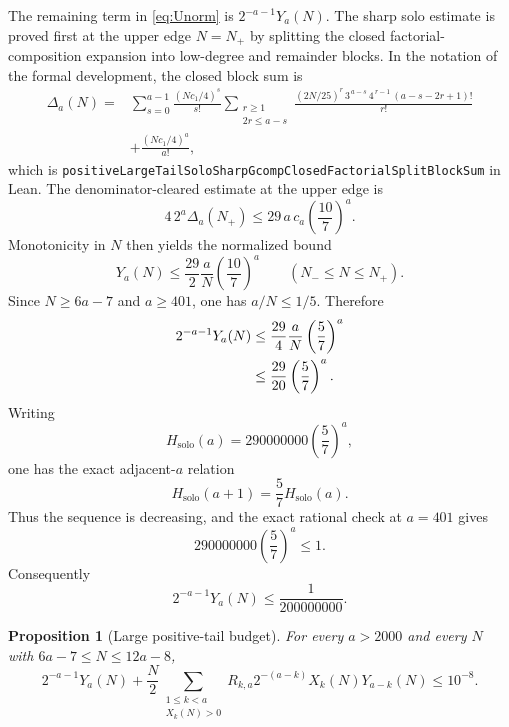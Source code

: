 \documentclass[11pt]{article}
\newtheorem{proposition}[theorem]{Proposition}
\theoremstyle{definition}
\theoremstyle{remark}
\newcommand{\code}[1]{\texttt{#1}}
\begin{document}
The remaining term in \eqref{eq:Unorm} is $2^{-a-1}Y_a(N)$.  The sharp solo
estimate is proved first at the upper edge $N=N_+$ by splitting the closed
factorial-composition expansion into low-degree and remainder blocks.  In the
notation of the formal development, the closed block sum is
\begin{equation}\label{eq:app-tail-solo-blocksum}
\begin{aligned}
 \Delta_a(N)
 ={}&\sum_{s=0}^{a-1}\frac{(Nc_1/4)^s}{s!}
 \sum_{\substack{r\ge1\\2r\le a-s}}
 \frac{(2N/25)^r\,3^{\,a-s}\,4^{\,r-1}\,(a-s-2r+1)!}{r!}\\
 &+\frac{(Nc_1/4)^a}{a!},
\end{aligned}
\end{equation}
which is \code{positiveLargeTailSoloSharpGcompClosedFactorialSplitBlockSum} in
Lean.  The denominator-cleared estimate at the upper edge is
\begin{equation}\label{eq:app-tail-solo-sharp}
 4\,2^a\Delta_a(N_+)
 \le29\,a\,c_a\left(\frac{10}{7}\right)^a.
\end{equation}
Monotonicity in $N$ then yields the normalized bound
\begin{equation}\label{eq:app-tail-solo-envelope}
 Y_a(N)\le\frac{29}{2}\frac aN
 \left(\frac{10}{7}\right)^a
 \qquad(N_-\le N\le N_+).
\end{equation}
Since $N\ge6a-7$ and $a\ge401$, one has $a/N\le1/5$.  Therefore
\begin{align}
 2^{-a-1}Y_a(N)
 &\le\frac{29}{4}\frac aN\left(\frac57\right)^a
 \notag\\
 &\le\frac{29}{20}\left(\frac57\right)^a.
 \label{eq:app-tail-solo-geometric}
\end{align}
Writing
\[
 H_{\mathrm{solo}}(a)=290000000\left(\frac57\right)^a,
\]
one has the exact adjacent-$a$ relation
\begin{equation}\label{eq:app-tail-solo-step}
 H_{\mathrm{solo}}(a+1)=\frac57H_{\mathrm{solo}}(a).
\end{equation}
Thus the sequence is decreasing, and the exact rational check at $a=401$
gives
\begin{equation}\label{eq:app-tail-solo-unit}
 290000000\left(\frac57\right)^a\le1.
\end{equation}
Consequently
\begin{equation}\label{eq:app-tail-solo-budget-final}
 2^{-a-1}Y_a(N)\le\frac1{200000000}.
\end{equation}

\begin{proposition}[Large positive-tail budget]
\label{prop:app-tail-final}
For every $a>2000$ and every $N$ with $6a-7\le N\le12a-8$,
\begin{equation}\label{eq:app-tail-final}
 2^{-a-1}Y_a(N)
 +\frac N2\sum_{\substack{1\le k<a\\X_k(N)>0}}
 R_{k,a}2^{-(a-k)}X_k(N)Y_{a-k}(N)
 \le10^{-8}.
\end{equation}
\end{proposition}
\end{document}
